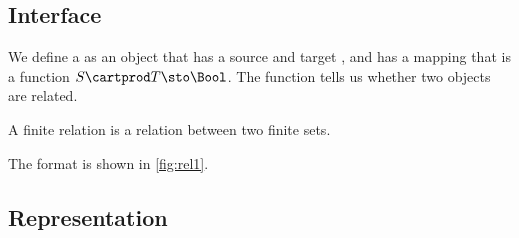 
\subsection*{Interface}

We define a \Relation as an object that has a source and target \Setoid, and has a mapping that is a function $S \cartprod T \sto \Bool$.
The function tells us whether two objects are related.


A finite relation  is a relation between two finite sets.


The format is shown in \cref{fig:rel1}.

\subsection*{Representation}{}

\begin{marginfigure}
    \caption{}
    \label{fig:rel1}
\end{marginfigure}


